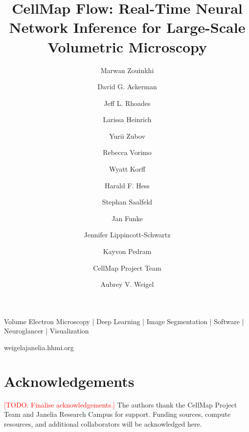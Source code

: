 \documentclass[times, twoside, watermark]{CellMapFlow-StyleBioRxiv}
\newcommand\todo[1]{\textcolor{red}{[TODO: #1]}}
\begin{document}
\title{CellMap Flow: Real-Time Neural Network Inference for Large-Scale Volumetric Microscopy}

\author[1,*]{Marwan Zouinkhi}
\author[1,*]{David G. Ackerman}
\author[1]{Jeff L. Rhoades}
\author[1]{Larissa Heinrich}
\author[1]{Yurii Zubov}
\author[1]{Rebecca Vorimo}
\author[1]{Wyatt Korff}
\author[1]{Harald F. Hess}
\author[1]{Stephan Saalfeld}
\author[2]{Jan Funke}
\author[1]{Jennifer Lippincott-Schwartz}
\author[1]{Kayvon Pedram}
\author[1]{CellMap Project Team}
\author[1,\href{mailto:weigela@janelia.hhmi.org}{\Letter}]{Aubrey V. Weigel}


\maketitle

\begin{abstract}

\end{abstract}

\begin{keywords}
Volume Electron Microscopy | Deep Learning | Image Segmentation | Software | Neuroglancer | Visualization
\end{keywords}

\begin{corrauthor}
weigela\at janelia.hhmi.org
\end{corrauthor}











\section*{Acknowledgements}
\todo{Finalise acknowledgements.} The authors thank the CellMap Project Team and Janelia Research Campus for support. Funding sources, compute resources, and additional collaborators will be acknowledged here.



\end{document}
